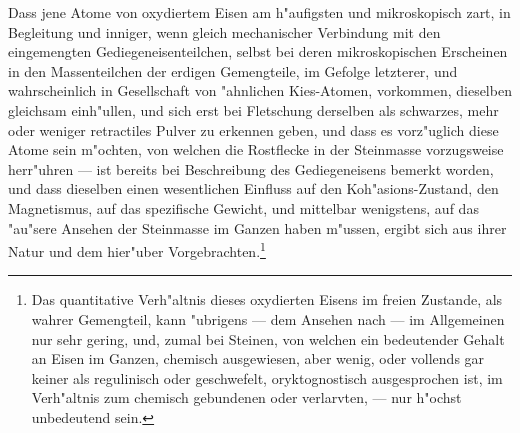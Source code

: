 \documentclass[a4paper, 11pt, oneside, german]{article}
\begin{document}
Dass jene Atome von oxydiertem Eisen am h"aufigsten und mikroskopisch zart, in Begleitung und inniger, wenn gleich mechanischer Verbindung mit den eingemengten Gediegeneisenteilchen, selbst bei deren mikroskopischen Erscheinen in den Massenteilchen der erdigen Gemengteile, im Gefolge letzterer, und wahrscheinlich in Gesellschaft von "ahnlichen Kies-Atomen, vorkommen, dieselben gleichsam einh"ullen, und sich erst bei Fletschung derselben als schwarzes, mehr oder weniger retractiles Pulver zu erkennen geben, und dass es vorz"uglich diese Atome sein m"ochten, von welchen die Rostflecke in der Steinmasse vorzugsweise herr"uhren --- ist bereits bei Beschreibung des Gediegeneisens bemerkt worden, und dass dieselben einen wesentlichen Einfluss auf den Koh"asions-Zustand, den Magnetismus, auf das spezifische Gewicht, und mittelbar wenigstens, auf das "au"sere Ansehen der Steinmasse im Ganzen haben m"ussen, ergibt sich aus ihrer Natur und dem hier"uber Vorgebrachten.\footnote{Das quantitative Verh"altnis dieses oxydierten Eisens im freien Zustande, als wahrer Gemengteil, kann "ubrigens --- dem Ansehen nach --- im Allgemeinen nur sehr gering, und, zumal bei Steinen, von welchen ein bedeutender Gehalt an Eisen im Ganzen, chemisch ausgewiesen, aber wenig, oder vollends gar keiner als regulinisch oder geschwefelt, oryktognostisch ausgesprochen ist, im Verh"altnis zum chemisch gebundenen oder verlarvten, --- nur h"ochst unbedeutend sein.}
\end{document}
